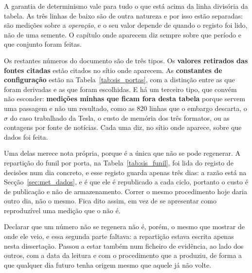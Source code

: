 A garantia de determinismo vale para tudo o que está acima da linha divisória da tabela. As três
linhas de baixo são de outra natureza e por isso estão separadas: são medições sobre a
\emph{operação}, e o seu valor depende de quando o registo foi lido, não de uma semente. O capítulo
onde aparecem diz sempre sobre que período e que conjunto foram feitas.

Os restantes números do documento são de três tipos. Os \textbf{valores retirados das fontes
citadas} estão citados no sítio onde aparecem. As \textbf{constantes de configuração} estão na
Tabela~\ref{tab:sis_portas}, com a distinção entre as que foram derivadas e as que foram
escolhidas. E há um terceiro tipo, que convém não esconder: \textbf{medições minhas que ficam
fora desta tabela} porque servem uma passagem e não um resultado, como as $820$ linhas que o
embargo descarta, o $\sigma$ do caso trabalhado da Tesla, o custo de memória dos três formatos, ou
as contagens por fonte de notícias. Cada uma diz, no sítio onde aparece, sobre que dados foi feita.

Uma delas merece nota própria, porque é a única que não se pode regenerar. A repartição do funil
por porta, na Tabela~\ref{tab:sis_funil}, foi lida do registo de decisões num dia concreto, e esse
registo guarda apenas três dias: a razão está na Secção~\ref{sec:met_dados}, e é que ele é
republicado a cada ciclo, portanto o custo é de publicação e não de armazenamento. Correr o mesmo
procedimento hoje daria outro dia, não o mesmo. Fica dito assim, em vez de se apresentar como
reproduzível uma medição que o não é.

Declarar que um número não se regenera não é, porém, o mesmo que mostrar de onde ele veio, e essa
segunda parte faltava: a repartição estava escrita apenas nesta dissertação. Passou a estar
também num ficheiro de evidência, ao lado dos outros, com a data da leitura e com o procedimento
que a produziu, de forma a que qualquer dia futuro tenha origem mesmo que aquele já não volte.

